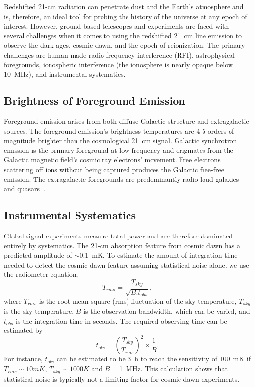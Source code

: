 Redshifted 21-cm radiation can penetrate dust and the Earth's atmosphere and is, therefore, an ideal tool for probing the history of the universe at any epoch of interest. However, ground-based telescopes and experiments are faced with several challenges when it comes to using the redshifted \SI{21}{cm} line emission to observe the dark ages, cosmic dawn, and the epoch of reionization. The primary challenges are human-made radio frequency interference (RFI), astrophysical foregrounds, ionospheric interference (the ionosphere is nearly opaque below 10~MHz), and instrumental systematics. 

\subsection*{Brightness of Foreground Emission}

Foreground emission arises from both diffuse Galactic structure and extragalactic sources. The foreground emission's brightness temperatures are 4-5 orders of magnitude brighter than the cosmological \SI{21}{cm} signal. Galactic synchrotron emission is the primary foreground at low frequency and originates from the Galactic magnetic field's cosmic ray electrons' movement. Free electrons scattering off ions without being captured produces the Galactic free-free emission. The extragalactic foregrounds are predominantly radio-loud galaxies and quasars~\citep{2018RAA....18..114H, 2008MNRAS.389.1319J}.

\subsection*{Instrumental Systematics}\label{s:chall}

Global signal experiments measure total power and are therefore dominated entirely by systematics. The 21-cm absorption feature from cosmic dawn has a predicted amplitude of $\sim$0.1~mK. To estimate the amount of integration time needed to detect the cosmic dawn feature assuming statistical noise alone, we use the radiometer equation,
\begin{equation}
T_{rms} = \frac{T_{sky}}{\sqrt{B. t_{obs}}},
\end{equation}
where $T_{rms}$ is the root mean square (rms) fluctuation of the sky temperature, $T_{sky}$ is the sky temperature, $B$ is the observation bandwidth, which can be varied, and $t_{obs}$ is the integration time in seconds. 
The required observing time can be estimated by
\begin{equation}
t_{obs} = \left ({\frac{T_{sky}}{T_{rms}}} \right )^2 \times \frac{1}{B}.
\end{equation}
For instance, $t_{obs}$ can be estimated to be \SI{3}{\hour} to reach the sensitivity of \SI{100}{\milli \kelvin} if $T_{rms} \sim 10 mK$, $T_{sky} \sim 1000 K$ and $B=$\SI{1}{\mega \hertz}. This calculation shows that statistical noise is typically not a limiting factor for cosmic dawn experiments.

